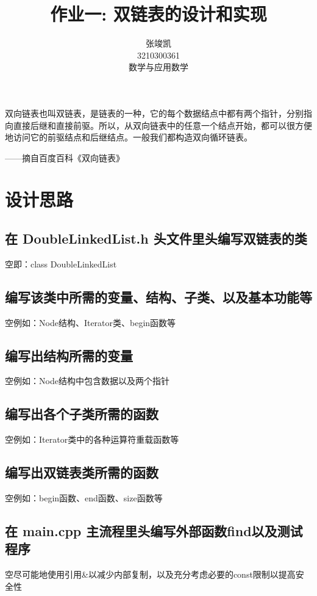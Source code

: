 \documentclass[UTF8]{ctexart}
\title{作业一: 双链表的设计和实现}
\author{张竣凯 \\ 3210300361 \\ 数学与应用数学}
\begin{document}
\maketitle

双向链表也叫双链表，是链表的一种，它的每个数据结点中都有两个指针，分别指向直接后继和直接前驱。所以，从双向链表中的任意一个结点开始，都可以很方便地访问它的前驱结点和后继结点。一般我们都构造双向循环链表。

\begin{flushright}
——摘自百度百科《双向链表》
\end{flushright}




\section{设计思路}

\subsection{在 DoubleLinkedList.h 头文件里头编写双链表的类}
\hphantom 空即：class DoubleLinkedList

\subsection{编写该类中所需的变量、结构、子类、以及基本功能等}
\hphantom 空例如：Node结构、Iterator类、begin函数等

\subsection{编写出结构所需的变量}
\hphantom 空例如：Node结构中包含数据以及两个指针

\subsection{编写出各个子类所需的函数}
\hphantom 空例如：Iterator类中的各种运算符重载函数等

\subsection{编写出双链表类所需的函数}
\hphantom 空例如：begin函数、end函数、size函数等

\subsection{在 main.cpp 主流程里头编写外部函数find以及测试程序}
\hphantom 空尽可能地使用引用&以减少内部复制，以及充分考虑必要的const限制以提高安全性
\end{document}

